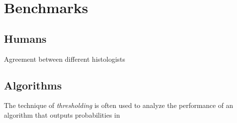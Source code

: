\section{Benchmarks}
\label{ch3:Bench}

\vspace{0.5cm}

\subsection{Humans}
\label{ch3:humans}


Agreement between different histologists

\subsection{Algorithms}

The technique of \textit{thresholding} is often used to analyze the performance of an algorithm that outputs probabilities in 

